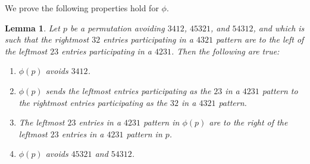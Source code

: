 \documentclass[11pt]{amsart}
\newtheorem{lemma}[theorem]{Lemma}
\theoremstyle{remark}
\numberwithin{equation}{section}
\begin{document}
We prove the following properties hold for $\phi$.

\begin{lemma}
    Let $p$ be a permutation avoiding $3412$, $45321$, and $54312$, and which is such that the rightmost $32$ entries participating in a $4321$ pattern are to the left of the leftmost $23$ entries participating in a $4231$. Then the following are true:
    \begin{enumerate}
        \item $\phi(p)$ avoids $3412$.
        \item $\phi(p)$ sends the leftmost entries participating as the $23$ in a $4231$ pattern to the rightmost entries participating as the $32$ in a $4321$ pattern.
        \item The leftmost $23$ entries in a $4231$ pattern in $\phi(p)$ are to the right of the leftmost $23$ entries in a $4231$ pattern in $p$.
        \item $\phi(p)$ avoids $45321$ and $54312$.
    \end{enumerate}
\end{lemma}
\end{document}
